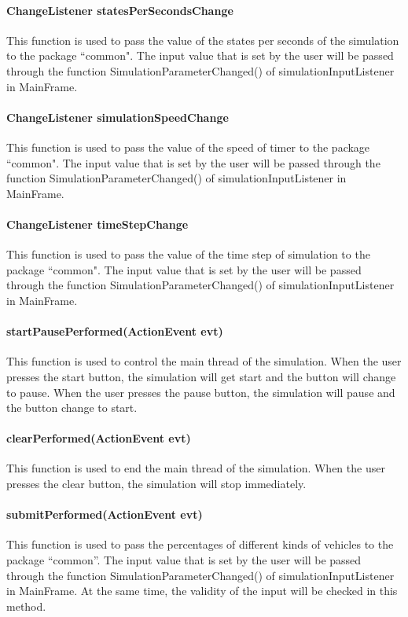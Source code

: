 \documentclass[a4paper,12pt]{article}
\begin{document}
\paragraph{ChangeListener statesPerSecondsChange} This function is used to pass the value of the states per seconds of the simulation to the package ``common". The input value that is set by the user will be passed through the function SimulationParameterChanged() of simulationInputListener in MainFrame.
\paragraph{ChangeListener simulationSpeedChange} This function is used to pass the value of the speed of timer to the package ``common". The input value that is set by the user will be passed through the function SimulationParameterChanged() of simulationInputListener in MainFrame.
\paragraph{ChangeListener timeStepChange}This function is used to pass the value of the time step of simulation to the package ``common". The input value that is set by the user will be passed through the function SimulationParameterChanged() of simulationInputListener in MainFrame.
\paragraph{startPausePerformed(ActionEvent evt)} This function is used to control the main thread of the simulation. When the user presses the start button, the simulation will get start and the button will change to pause. When the user presses the pause button, the simulation will pause and the button change to start.
\paragraph{clearPerformed(ActionEvent evt)} This function is used to end the main thread of the simulation. When the user presses the clear button, the simulation will stop immediately.
\paragraph{submitPerformed(ActionEvent evt)} This function is used to pass the percentages of different kinds of vehicles to the package ``common''. The input value that is set by the user will be passed through the function SimulationParameterChanged() of simulationInputListener in MainFrame. At the same time, the validity of the input will be checked in this method.
\end{document}
